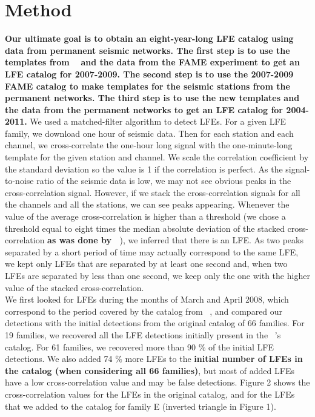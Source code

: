 \documentclass[draft]{agujournal2019}
\begin{document}
\section{Method}

\textbf{Our ultimate goal is to obtain an eight-year-long LFE catalog using data from permanent seismic networks. The first step is to use the templates from ~ and the data from the FAME experiment to get an LFE catalog for 2007-2009. The second step is to use the 2007-2009 FAME catalog to make templates for the seismic stations from the permanent networks. The third step is to use the new templates and the data from the permanent networks to get an LFE catalog for 2004-2011.} We used a matched-filter algorithm to detect LFEs. For a given LFE family, we download one hour of seismic data. Then for each station and each channel, we cross-correlate the one-hour long signal with the one-minute-long template for the given station and channel. We scale the correlation coefficient by the standard deviation so the value is 1 if the correlation is perfect. As the signal-to-noise ratio of the seismic data is low, we may not see obvious peaks in the cross-correlation signal. However, if we stack the cross-correlation signals for all the channels and all the stations, we can see peaks appearing. Whenever the value of the average cross-correlation is higher than a threshold (we chose a threshold equal to eight times the median absolute deviation of the stacked cross-correlation \textbf{as was done by ~}), we inferred that there is an LFE. As two peaks separated by a short period of time may actually correspond to the same LFE, we kept only LFEs that are separated by at least one second and, when two LFEs are separated by less than one second, we keep only the one with the higher value of the stacked cross-correlation. \\

We first looked for LFEs during the months of March and April 2008, which correspond to the period covered by the catalog from ~, and compared our detections with the initial detections from the original catalog of 66 families. For 19 families, we recovered all the LFE detections initially present in the ~'s catalog. For 61 families, we recovered more than 90 \% of the initial LFE detections. We also added 74 \% more LFEs to the \textbf{initial number of LFEs in the catalog (when considering all 66 families)}, but most of added LFEs have a low cross-correlation value and may be false detections. Figure 2 shows the cross-correlation values for the LFEs in the original catalog, and for the LFEs that we added to the catalog for family E (inverted triangle in Figure 1). \\
\end{document}
